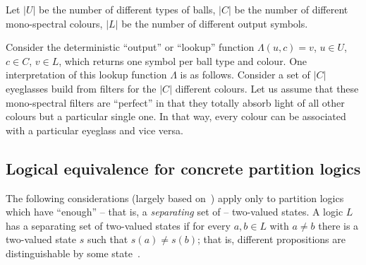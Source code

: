 Let
$\vert U\vert $ be the number of different types of balls,
$\vert C\vert $ be the number of different mono-spectral colours,
$\vert L\vert $ be the number of different output symbols.

Consider the deterministic ``output'' or ``lookup''
function $\Lambda (u,c)=v$,
$u\in U$,
$c\in C$,
$v\in L$,
which returns one symbol per ball type and colour.
One interpretation of this lookup function $\Lambda$ is as follows.
Consider a set of $\vert C\vert $ eyeglasses build from filters for the
$\vert C\vert $ different colours.
Let us assume that these mono-spectral filters are
``perfect'' in that they totally absorb light of all other colours
but a particular single one.
In that way, every colour can be associated with a particular eyeglass and vice versa.


\subsection{Logical equivalence for concrete partition logics}


The following considerations (largely based on~\cite{svozil-2001-eua,svozil-2008-ql})  apply only to partition logics
which  have ``enough'' -- that is, a {\em separating} set of -- two-valued states.
A logic $L$ has a separating
set of two-valued states if for every $a,b\in L$ with $a \neq b$ there is a two-valued state
$s$ such that $s(a) \neq s(b)$;
that is,  different propositions are distinguishable by some state~\cite{svozil-tkadlec}.


